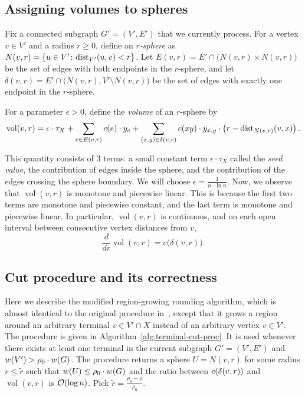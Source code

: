 \subsection{Assigning volumes to spheres}

Fix a connected subgraph $G'=(V',E')$ that we currently process.
For a vertex $v\in V'$ and a radius $r\ge 0$, define an \emph{$r$-sphere} as $
N(v,r)=\{u\in V'\colon \text{dist}_{V'}(u,v)<r\}$. Let $
E(v,r)=E'\cap \bigl(N(v,r)\times N(v,r)\bigr) $ be the set of edges with both endpoints in the $r$-sphere, and let $
\delta(v,r)=E'\cap \bigl(N(v,r),V'\setminus N(v,r)\bigr)$ be the set of edges with exactly one endpoint in the $r$-sphere.

For a parameter $\epsilon>0$, define the \emph{volume} of an $r$-sphere by
\[
\operatorname{vol}(v,r)=\epsilon\cdot \tau_X
+\sum_{e\in E(v,r)} c(e)\cdot y_e
+\sum_{(x,y)\in \delta(v,r)} c(xy)\cdot y_{x,y}\cdot \mathopen{}\left( r-\text{dist}_{N(v,r)}(v,x) \right).
\]

This quantity consists of 3 terms: a small constant term $\epsilon\cdot\tau_X$ called the \emph{seed value}, the contribution of edges inside the sphere, and the contribution of the edges crossing the sphere boundary. We will choose $\epsilon=\frac{1}{n\cdot\ln n}$.
Now, we observe that $\operatorname{vol}(v,r)$ is monotone and piecewise linear. This is because the first two terms are monotone and piecewise constant, and the last term is monotone and piecewise linear. In particular, $\operatorname{vol}(v,r)$ is continuous, and on each open interval between consecutive vertex distances from $v$,
\[
\frac{d}{dr}\operatorname{vol}(v,r)=c\bigl(\delta(v,r)\bigr).
\]

\subsection{Cut procedure and its correctness}

Here we describe the modified region-growing rounding algorithm, which is almost identical to the original procedure in~\cite{FastApproximateGraphPartitioningAlgorithms}, except that it grows a region around an arbitrary terminal $v\in V'\cap X$ instead of an arbitrary vertex $v\in V'$. The procedure is given in Algorithm~\ref{alg:terminal-cut-proc}. It is used whenever there exists at least one terminal in the current subgraph $G'=(V',E')$ and $w\mathopen{}\left( V' \right)>\rho_0\cdot w\mathopen{}\left( G \right)$. The procedure returns a sphere $U=N(v,r)$ for some radius $r\le \tilde r$ such that $w\mathopen{}\left( U \right)\le \rho_0\cdot w\mathopen{}\left( G \right)$ and the ratio between $c\mathopen{}\left( \delta\mathopen{}\left( v, r \right) \right)$ and $\operatorname{vol}(v,r)$ is $\mathcal{O}\mathopen{}\left( \log n \right)$. Pick $
\tilde r=\frac{\rho_0-\rho}{\rho_0}.$



